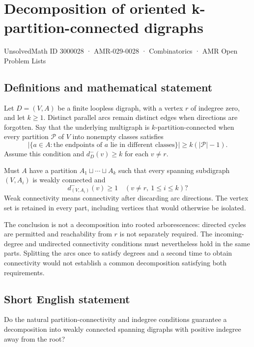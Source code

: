 \documentclass[11pt,a4paper]{article}
\begin{document}
\section*{Decomposition of oriented k-partition-connected digraphs}\label{3000028}
{\small UnsolvedMath ID 3000028 · AMR-029-0028 · Combinatorics · AMR Open Problem Lists}
\subsection{Definitions and mathematical statement}
Let $D=(V,A)$ be a finite loopless digraph, with a vertex $r$ of
indegree zero, and let $k\ge1$. Distinct parallel arcs remain distinct
edges when directions are forgotten. Say that the underlying multigraph
is $k$-partition-connected when every partition $\mathcal P$ of $V$
into nonempty classes satisfies
\[
  |\{a\in A:\text{the endpoints of }a\text{ lie in different classes}\}|
                                       \ge k(|\mathcal P|-1).
\]
Assume this condition and $d_D^-(v)\ge k$ for each $v\ne r$.

Must $A$ have a partition $A_1\sqcup\cdots\sqcup A_k$ such that every
spanning subdigraph $(V,A_i)$ is weakly connected and
\[
                           d^-_{(V,A_i)}(v)\ge1
                                  \quad(v\ne r,\ 1\le i\le k)?
\]
Weak connectivity means connectivity after discarding arc directions.
The vertex set is retained in every part, including vertices that would
otherwise be isolated.

The conclusion is not a decomposition into rooted arborescences:
directed cycles are permitted and reachability from $r$ is not separately
required. The incoming-degree and undirected connectivity conditions
must nevertheless hold in the same parts. Splitting the arcs once to
satisfy degrees and a second time to obtain connectivity would not
establish a common decomposition satisfying both requirements.
\subsection{Short English statement}
Do the natural partition-connectivity and indegree conditions
guarantee a decomposition into weakly connected spanning digraphs with positive indegree away from the root?
\end{document}
